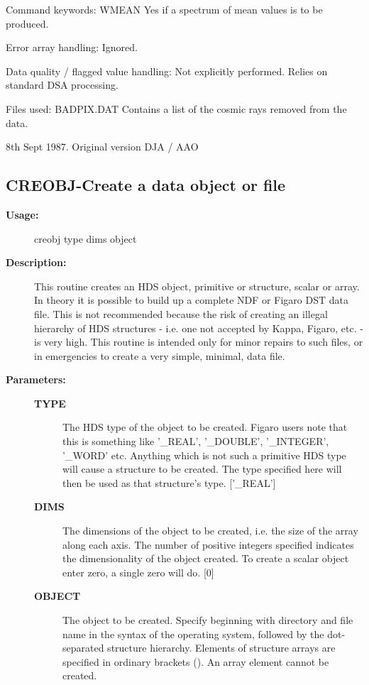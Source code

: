 \begin{description}
\begin{description}
\begin{terminalv}
 Command keywords:
    WMEAN    Yes if a spectrum of mean values is to be produced.

 Error array handling: Ignored.

 Data quality / flagged value handling:
    Not explicitly performed.  Relies on standard DSA processing.

 Files used:
    BADPIX.DAT  Contains a list of the cosmic rays removed from the data.

    8th  Sept  1987.   Original version DJA / AAO
\end{terminalv}
\end{description}
\subsection{CREOBJ-\label{CREOBJ}Create a data object or file}
\begin{description}

\item [\textbf{Usage:}]
 creobj type dims object

\item [\textbf{Description:}]
 This routine creates an HDS object, primitive or structure, scalar
 or array. In theory it is possible to build up a complete NDF or
 Figaro DST data file. This is not recommended because the risk of
 creating an illegal hierarchy of HDS structures - i.e. one not
 accepted by Kappa, Figaro, etc. - is very high. This routine is
 intended only for minor repairs to such files, or in emergencies
 to create a very simple, minimal, data file.

\item [\textbf{Parameters:}]
\begin{description}
\item [\textbf{TYPE}]
 The HDS type of the object to be created. Figaro users note
 that this is something like '\_REAL', '\_DOUBLE', '\_INTEGER',
 '\_WORD' etc. Anything which is not such a primitive HDS type
 will cause a structure to be created. The type specified here
 will then be used as that structure's type.
 ['\_REAL']
\item [\textbf{DIMS}]
 The dimensions of the object to be created, i.e. the size of
 the array along each axis. The number of positive integers
 specified indicates the dimensionality of the object created.
 To create a scalar object enter zero, a single zero will do.
 [0]
\item [\textbf{OBJECT}]
 The object to be created. Specify beginning with directory and
 file name in the syntax of the operating system, followed by
 the dot-separated structure hierarchy. Elements of structure
 arrays are specified in ordinary brackets (). An array element
 cannot be created.
\end{description}


\end{description}
\end{description}
